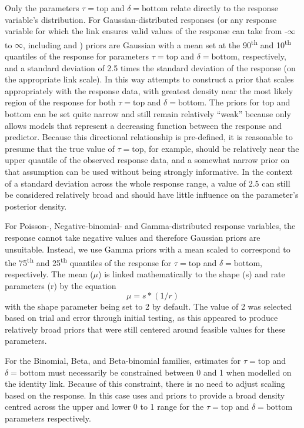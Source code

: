 \documentclass[
  shortnames]{jss}
\begin{document}
Only the parameters \(\tau = \text{top}\) and \(\delta = \text{bottom}\) relate directly to the response variable's distribution. For Gaussian-distributed responses (or any response variable for which the link ensures valid values of the response can take from -\(\infty\) to \(\infty\), including  and ) priors are Gaussian with a mean set at the 90\textsuperscript{th} and 10\textsuperscript{th} quantiles of the response for parameters \(\tau = \text{top}\) and \(\delta = \text{bottom}\), respectively, and a standard deviation of 2.5 times the standard deviation of the response (on the appropriate link scale). In this way  attempts to construct a prior that scales appropriately with the response data, with greatest density near the most likely region of the response for both \(\tau = \text{top}\) and \(\delta = \text{bottom}\). The priors for top and bottom can be set quite narrow and still remain relatively ``weak'' because  only allows models that represent a decreasing function between the response and predictor. Because this directional relationship is pre-defined, it is reasonable to presume that the true value of \(\tau = \text{top}\), for example, should be relatively near the upper quantile of the observed response data, and a somewhat narrow prior on that assumption can be used without being strongly informative. In the context of a standard deviation across the whole response range, a value of 2.5 can still be considered relatively broad and should have little influence on the parameter's posterior density.

For Poisson-, Negative-binomial- and Gamma-distributed response variables, the response cannot take negative values and therefore Gaussian priors are unsuitable. Instead, we use Gamma priors with a mean scaled to correspond to the 75\textsuperscript{th} and 25\textsuperscript{th} quantiles of the response for \(\tau = \text{top}\) and \(\delta = \text{bottom}\), respectively. The mean (\(\mu\)) is linked mathematically to the shape (s) and rate parameters (r) by the equation \[ \mu = s * (1/r) \] \citep{Becker1988} with the shape parameter being set to 2 by default. The value of 2 was selected based on trial and error through initial testing, as this appeared to produce relatively broad priors that were still centered around feasible values for these parameters.

For the Binomial, Beta, and Beta-binomial families, estimates for \(\tau = \text{top}\) and \(\delta = \text{bottom}\) must necessarily be constrained between 0 and 1 when modelled on the identity link. Because of this constraint, there is no need to adjust scaling based on the response. In this case  uses  and  priors to provide a broad density centred across the upper and lower 0 to 1 range for the \(\tau = \text{top}\) and \(\delta = \text{bottom}\) parameters respectively.
\end{document}
